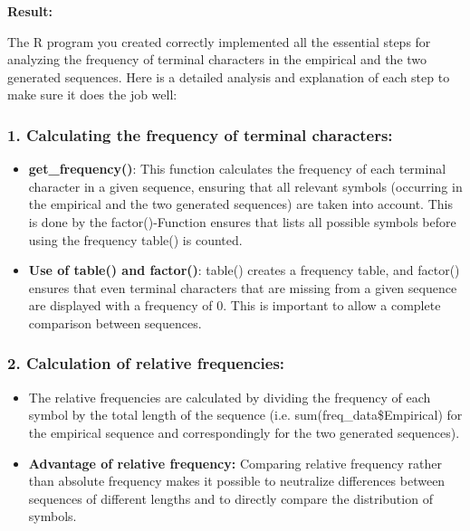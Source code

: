 \documentclass[
]{article}
\begin{document}
\textbf{Result:}

The R program you created correctly implemented all the essential steps
for analyzing the frequency of terminal characters in the empirical and
the two generated sequences. Here is a detailed analysis and explanation
of each step to make sure it does the job well:

\subsubsection{\texorpdfstring{\textbf{1. Calculating the frequency of
terminal
characters:}}{1. Calculating the frequency of terminal characters:}}\label{calculating-the-frequency-of-terminal-characters}

\begin{itemize}
\item
  \textbf{get\_frequency()}: This function calculates the frequency of
  each terminal character in a given sequence, ensuring that all
  relevant symbols (occurring in the empirical and the two generated
  sequences) are taken into account. This is done by the
  factor()-Function ensures that lists all possible symbols before using
  the frequency table() is counted.
\item
  \textbf{Use of table() and factor()}: table() creates a frequency
  table, and factor() ensures that even terminal characters that are
  missing from a given sequence are displayed with a frequency of 0.
  This is important to allow a complete comparison between sequences.
\end{itemize}

\subsubsection{\texorpdfstring{\textbf{2. Calculation of relative
frequencies:}}{2. Calculation of relative frequencies:}}\label{calculation-of-relative-frequencies}

\begin{itemize}
\item
  The relative frequencies are calculated by dividing the frequency of
  each symbol by the total length of the sequence (i.e.
  sum(freq\_data\$Empirical) for the empirical sequence and
  correspondingly for the two generated sequences).
\item
  \textbf{Advantage of relative frequency:} Comparing relative frequency
  rather than absolute frequency makes it possible to neutralize
  differences between sequences of different lengths and to directly
  compare the distribution of symbols.
\end{itemize}
\end{document}
